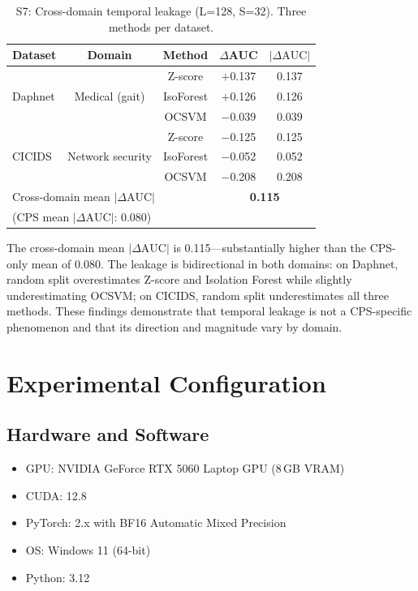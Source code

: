\documentclass[12pt]{article}
\begin{document}
\begin{table}[htbp]
\centering
\caption{S7: Cross-domain temporal leakage (L=128, S=32). Three methods per dataset.}
\begin{tabular}{lcccc}
\toprule
Dataset & Domain & Method & $\Delta$AUC & $|\Delta\text{AUC}|$ \\
\midrule
\multirow{3}{*}{Daphnet} & \multirow{3}{*}{Medical (gait)} & Z-score  & $+$0.137 & 0.137 \\
                          &                              & IsoForest & $+$0.126 & 0.126 \\
                          &                              & OCSVM     & $-$0.039 & 0.039 \\
\midrule
\multirow{3}{*}{CICIDS}  & \multirow{3}{*}{Network security} & Z-score  & $-$0.125 & 0.125 \\
                          &                                 & IsoForest & $-$0.052 & 0.052 \\
                          &                                 & OCSVM     & $-$0.208 & 0.208 \\
\midrule
\midrule
\multicolumn{3}{l}{Cross-domain mean $|\Delta\text{AUC}|$} & \multicolumn{2}{c}{\textbf{0.115}} \\
\multicolumn{3}{l}{(CPS mean $|\Delta\text{AUC}|$: 0.080)} & \multicolumn{2}{c}{} \\
\bottomrule
\end{tabular}
\end{table}

The cross-domain mean $|\Delta\text{AUC}|$ is 0.115---substantially higher than the CPS-only mean of 0.080. The leakage is bidirectional in both domains: on Daphnet, random split overestimates Z-score and Isolation Forest while slightly underestimating OCSVM; on CICIDS, random split underestimates all three methods. These findings demonstrate that temporal leakage is not a CPS-specific phenomenon and that its direction and magnitude vary by domain.

\section{Experimental Configuration}

\subsection{Hardware and Software}
\begin{itemize}
    \item GPU: NVIDIA GeForce RTX 5060 Laptop GPU (8\,GB VRAM)
    \item CUDA: 12.8
    \item PyTorch: 2.x with BF16 Automatic Mixed Precision
    \item OS: Windows 11 (64-bit)
    \item Python: 3.12
\end{itemize}
\end{document}
